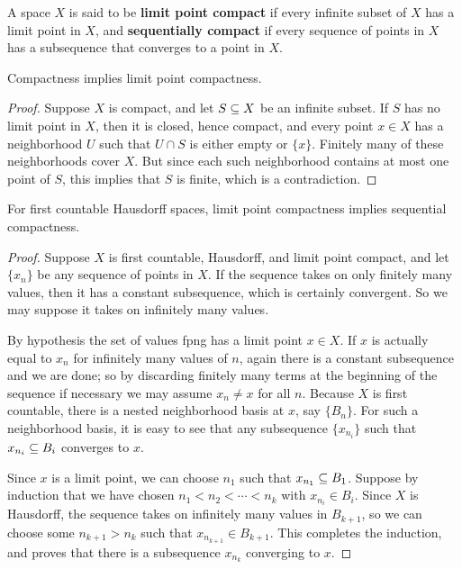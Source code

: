 A space $X$ is said to be \textbf{limit point compact} if every infinite subset of $X$ has a limit point in $X$, and \textbf{sequentially compact} if every sequence of points in $X$ has a subsequence that converges to a point in $X$.
\begin{proposition}\label{compact to limit point}
Compactness implies limit point compactness.
\end{proposition}
\begin{proof}
Suppose $X$ is compact, and let $S\subseteq X$ be an infinite subset. If $S$ has no limit point in $X$, then it is closed, hence compact, and every point $x\in X$ has a neighborhood $U$ such that $U\cap S$ is either empty or $\{x\}$. Finitely many of these neighborhoods cover $X$. But since each such neighborhood contains at most one point of $S$, this implies that $S$ is finite, which is a contradiction.
\end{proof}
\begin{proposition}\label{limit point compact to seq}
For first countable Hausdorff spaces, limit point compactness implies sequential compactness.
\end{proposition}
\begin{proof}
Suppose $X$ is first countable, Hausdorff, and limit point compact, and let $\{x_n\}$ be any sequence of points in $X$. If the sequence takes on only finitely
many values, then it has a constant subsequence, which is certainly convergent. So
we may suppose it takes on infinitely many values.\par
By hypothesis the set of values fpng has a limit point $x\in X$. If $x$ is actually equal to $x_n$ for infinitely many values of $n$, again there is a constant subsequence and we are done; so by discarding finitely many terms at the beginning of the sequence if necessary we may assume $x_n\neq x$ for all $n$. Because $X$ is first countable, there is a nested neighborhood basis at $x$, say $\{B_n\}$. For such a neighborhood basis, it is easy to see that any subsequence $\{x_{n_i}\}$ such that $x_{n_i}\subseteq B_i$ converges to $x$.\par
Since $x$ is a limit point, we can choose $n_1$ such that $x_{n_1}\subseteq B_1$. Suppose by induction that we have chosen $n_1<n_2<\cdots<n_k$ with $x_{n_i}\in B_i$. Since $X$ is Hausdorff, the sequence takes on infinitely many values in $B_{k+1}$, so we can choose some $n_{k+1}>n_k$ such that $x_{n_{k+1}}\in B_{k+1}$. This completes the induction, and proves that there is a subsequence $x_{n_k}$ converging to $x$.
\end{proof}
